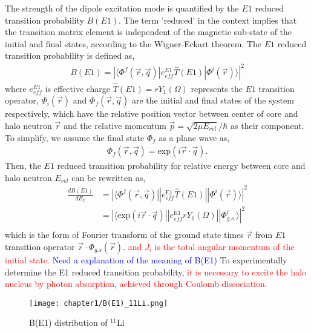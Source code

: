 The strength of the dipole excitation mode is quantified by the $E1$ reduced transition probability $B(E1)$. The term 'reduced' in the context implies that the transition matrix element is independent of the magnetic sub-state of the initial and final states, according to the Wigner-Eckart theorem. The $E1$ reduced transition probability is defined as,
\begin{align}
    B(E1) = |\langle \Phi^f(\vec{r},\vec{q}) |e_{eff}^{E1}\hat{T}(E1)| \Phi^i(\vec{r})\rangle|^2 
\end{align}
where $e_{eff}^{E1}$ is effective charge $\hat{T}(E1) = rY_{1}(\Omega)$ represents the $E1$ transition operator, $\Phi_i(\vec{r})$ and $\Phi_f(\vec{r},\vec{q})$ are the initial and final states of the system respectively, which have the relative position vector between center of core and halo neutron $\vec{r}$ and the relative momentum $\vec{p} = \sqrt{2\mu E_{rel}}/\hbar$ as their component. To simplify, we assume the final state $\Phi_f$ as a plane wave as,
\begin{align}
    \Phi_f(\vec{r},\vec{q}) = \text{exp}(i\vec{r}\cdot\vec{q}).
\end{align}
Then, the $E1$ reduced transition probability for relative energy between core and halo neutron $E_{rel}$ can be rewritten as,
\begin{align}
    \frac{dB(E1)}{dE_x} &= |\langle \Phi^f(\vec{r},\vec{q}) ||e_{eff}^{\text{E1}}\hat{T}(E1)|| \Phi^i(\vec{r})\rangle|^2 \\
                        &= |\langle \text{exp}(i\vec{r}\cdot\vec{q}) ||e_{eff}^{\text{E1}}rY_{1}(\Omega)|| \Phi^i_{g.s.}\rangle|^2 \\
\end{align}
which is the form of Fourier transform of the ground state times $\vec{r}$ from $E1$ transition operator $\vec{r} \cdot \Phi_{g.s}(\vec{r})$. 
\textcolor{red}{and $J_i$ is the total angular momentum of the initial state.} \textcolor{blue}{Need a explanation of the meaning of B(E1)} To experimentally determine the E1 reduced transition probability, \textcolor{red}{it is necessary to excite the halo nucleus by photon absorption, achieved through Coulomb dissociation.} 

\begin{figure}
    \centering
    \texttt{[image: chapter1/B(E1)\_11Li.png]}
    \caption{B(E1) distribution of $^{11}$Li \cite{Nakamura06}}
    \label{fig:Coulomb_dissociation}
\end{figure}

